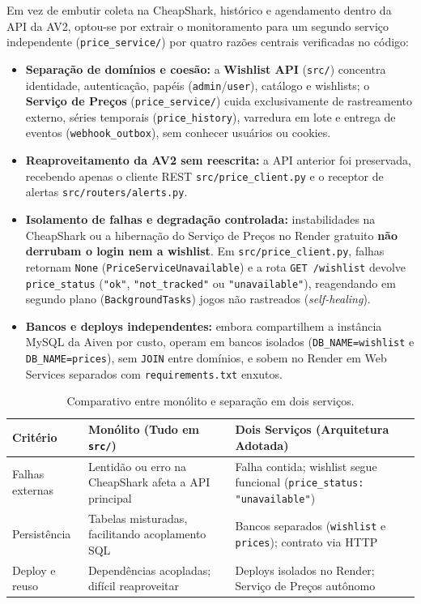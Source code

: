 \documentclass[11pt,a4paper]{article}
\begin{document}
Em vez de embutir coleta na CheapShark, histórico e agendamento dentro da API da AV2, optou-se por extrair o monitoramento para um segundo serviço independente (\texttt{price\_service/}) por quatro razões centrais verificadas no código:
\begin{itemize}
    \item \textbf{Separação de domínios e coesão:} a \textbf{Wishlist API} (\texttt{src/}) concentra identidade, autenticação, papéis (\texttt{admin}/\texttt{user}), catálogo e wishlists; o \textbf{Serviço de Preços} (\texttt{price\_service/}) cuida exclusivamente de rastreamento externo, séries temporais (\texttt{price\_history}), varredura em lote e entrega de eventos (\texttt{webhook\_outbox}), sem conhecer usuários ou cookies.
    \item \textbf{Reaproveitamento da AV2 sem reescrita:} a API anterior foi preservada, recebendo apenas o cliente REST \texttt{src/price\_client.py} e o receptor de alertas \texttt{src/routers/alerts.py}.
    \item \textbf{Isolamento de falhas e degradação controlada:} instabilidades na CheapShark ou a hibernação do Serviço de Preços no Render gratuito \textbf{não derrubam o login nem a wishlist}. Em \texttt{src/price\_client.py}, falhas retornam \texttt{None} (\texttt{PriceServiceUnavailable}) e a rota \texttt{GET /wishlist} devolve \texttt{price\_status} (\texttt{"ok"}, \texttt{"not\_tracked"} ou \texttt{"unavailable"}), reagendando em segundo plano (\texttt{BackgroundTasks}) jogos não rastreados (\textit{self-healing}).
    \item \textbf{Bancos e deploys independentes:} embora compartilhem a instância MySQL da Aiven por custo, operam em bancos isolados (\texttt{DB\_NAME=wishlist} e \texttt{DB\_NAME=prices}), sem \texttt{JOIN} entre domínios, e sobem no Render em Web Services separados com \texttt{requirements.txt} enxutos.
\end{itemize}

\begin{table}[H]
\centering
\caption{Comparativo entre monólito e separação em dois serviços.}
\label{tab:comparativo}
\footnotesize
\begin{tabularx}{\textwidth}{@{}l Y Y@{}}
\toprule
\textbf{Critério} & \textbf{Monólito (Tudo em \texttt{src/})} & \textbf{Dois Serviços (Arquitetura Adotada)} \\
\midrule
Falhas externas & Lentidão ou erro na CheapShark afeta a API principal & Falha contida; wishlist segue funcional (\texttt{price\_status: "unavailable"}) \\
Persistência & Tabelas misturadas, facilitando acoplamento SQL & Bancos separados (\texttt{wishlist} e \texttt{prices}); contrato via HTTP \\
Deploy e reuso & Dependências acopladas; difícil reaproveitar & Deploys isolados no Render; Serviço de Preços autônomo \\
\bottomrule
\end{tabularx}
\end{table}
\end{document}

